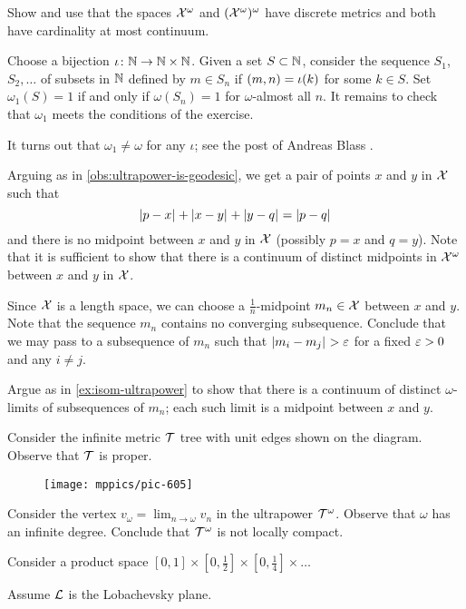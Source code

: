 Show and use that the spaces $\mathcal{X}^\omega$ and $(\mathcal{X}^\omega)^\omega$ have discrete metrics and both have cardinality at most continuum.


Choose a bijection $\iota\colon\mathbb{N}\to \mathbb{N}\times \mathbb{N}$.
Given a set $S\subset \mathbb{N}$, consider the sequence $S_1$, $S_2,\dots$ of subsets in $\mathbb{N}$ defined by $m\in S_n$ if $(m,n)\z=\iota(k)$ for some $k\in S$.
Set $\omega_1(S)=1$ if and only if $\omega(S_n)=1$ for $\omega$-almost all $n$.
It remains to check that $\omega_1$ meets the conditions of the exercise.

It turns out that $\omega_1\ne \omega$ for any $\iota$;
see the post of Andreas Blass \cite{blass}.

Arguing as in \ref{obs:ultrapower-is-geodesic}, we get a pair of points $x$ and $y$ in $\mathcal{X}$ such that
\[\dist{p}{x}{}+\dist{x}{y}{}+\dist{y}{q}{}=\dist{p}{q}{}\]
and there is no midpoint between $x$ and $y$ in $\mathcal{X}$
(possibly $p=x$ and $q=y$).
Note that it is sufficient to show that there is a continuum of distinct midpoints in $\mathcal{X}^\omega$ between $x$ and $y$ in $\mathcal{X}$.

Since $\mathcal{X}$ is a length space, we can choose a $\tfrac1n$-midpoint $m_n\in\mathcal{X}$ between $x$ and $y$.
Note that the sequence $m_n$ contains no converging subsequence.
Conclude that we may pass to a subsequence of $m_n$ such that $\dist{m_i}{m_j}{}>\eps$ for a fixed $\varepsilon>0$ and any $i\ne j$.

Argue as in \ref{ex:isom-ultrapower} to show that there is a continuum of distinct $\omega$-limits of subsequences of $m_n$;
each such limit is a midpoint between $x$ and $y$.

 Consider the infinite metric $\mathcal{T}$ tree with unit edges shown
on the diagram.
Observe that $\mathcal{T}$ is proper.

\begin{figure}[ht!]
\vskip-0mm
\centering
\texttt{[image: mppics/pic-605]}
\end{figure}

Consider the vertex $v_\omega=\lim_{n\to\omega}v_n$ in the ultrapower $\mathcal{T}^\omega$.
Observe that $\omega$ has an infinite degree.
Conclude that $\mathcal{T}^\omega$ is not locally compact.

Consider a product space $[0,1]\times[0,\tfrac12]\times[0,\tfrac14]\times\dots$

 Assume $\mathcal{L}$ is the Lobachevsky plane.

